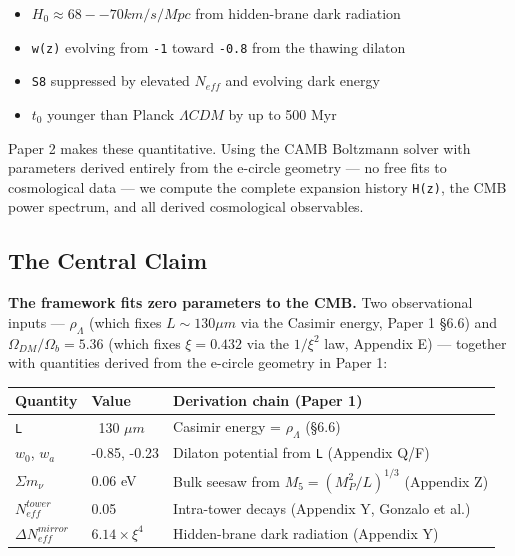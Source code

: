 \documentclass[aps,prd,preprint,superscriptaddress,longbibliography]{revtex4-2}
\begin{document}
\begin{itemize}
  \item $H_{0} \approx 68--70 km/s/Mpc$ from hidden-brane dark radiation
  \item \texttt{w(z)} evolving from \texttt{-1} toward \texttt{-0.8} from the thawing dilaton
  \item \texttt{S8} suppressed by elevated $N_{eff}$ and evolving dark energy
  \item $t_{0}$ younger than Planck $\Lambda CDM$ by up to 500 Myr
\end{itemize}

Paper 2 makes these quantitative. Using the CAMB Boltzmann solver with parameters derived entirely from the e-circle geometry --- no free fits to cosmological data --- we compute the complete expansion history \texttt{H(z)}, the CMB power spectrum, and all derived cosmological observables.


\subsection{The Central Claim}

\textbf{The framework fits zero parameters to the CMB.} Two observational inputs --- $\rho_\Lambda$ (which fixes $L \sim  130 \mu m$ via the Casimir energy, Paper 1 \S{}6.6) and $\Omega_{DM}/\Omega_b = 5.36$ (which fixes $\xi = 0.432$ via the $1/\xi^{2}$ law, Appendix E) --- together with quantities derived from the e-circle geometry in Paper 1:


\begin{table}[H]
\begin{ruledtabular}
\begin{tabular}{p{5.0cm}p{5.0cm}p{5.0cm}}
Quantity & Value & Derivation chain (Paper 1) \\
\hline
\texttt{L} & ~130 $\mu m$ & Casimir energy = $\rho_\Lambda$ (\S{}6.6) \\
$w_{0}$, $w_a$ & -0.85, -0.23 & Dilaton potential from \texttt{L} (Appendix Q/F) \\
$\Sigma m_\nu$ & 0.06 eV & Bulk seesaw from $M_{5} = (M_P^{2}/L)^{1/3}$ (Appendix Z) \\
$N_{eff}^{tower}$ & 0.05 & Intra-tower decays (Appendix Y, Gonzalo et al.) \\
$\Delta N_{eff}^{mirror}$ & $6.14 \times \xi^{4}$ & Hidden-brane dark radiation (Appendix Y) \\
\end{tabular}
\end{ruledtabular}
\end{table}
\end{document}
